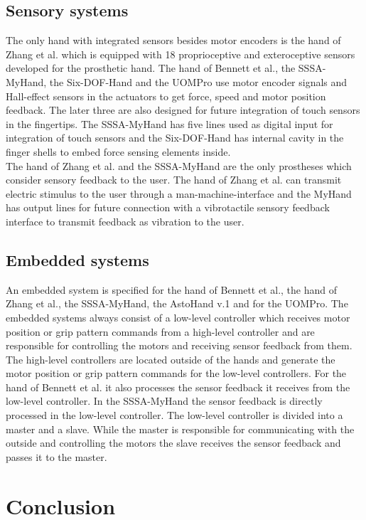 \documentclass[a4paper, 10pt, conference]{ieeeconf}      %
\begin{document}
\subsection{Sensory systems}

The only hand with integrated sensors besides motor encoders is the hand of Zhang et al. which is equipped with 18 proprioceptive and exteroceptive sensors developed for the prosthetic hand. The hand of Bennett et al., the SSSA-MyHand, the Six-DOF-Hand and the UOMPro use motor encoder signals and Hall-effect sensors in the actuators to get force, speed and motor position feedback. The later three are also designed for future integration of touch sensors in the fingertips. The SSSA-MyHand has five lines used as digital input for integration of touch sensors and the Six-DOF-Hand has internal cavity in the finger shells to embed force sensing elements inside.\\
The hand of Zhang et al. and the SSSA-MyHand are the only prostheses which consider sensory feedback to the user. The hand of Zhang et al. can transmit electric stimulus to the user through a man-machine-interface and the MyHand has output lines for future connection with a vibrotactile sensory feedback interface to transmit feedback as vibration to the user.

\subsection{Embedded systems}

An embedded system is specified for the hand of Bennett et al., the hand of Zhang et al., the SSSA-MyHand, the AstoHand v.1 and for the UOMPro. The embedded systems always consist of a low-level controller which receives motor position or grip pattern commands from a high-level controller and are responsible for controlling the motors and receiving sensor feedback from them. The high-level controllers are located outside of the hands and generate the motor position or grip pattern commands for the low-level controllers. For the hand of Bennett et al. it also processes the sensor feedback it receives from the low-level controller. In the SSSA-MyHand the sensor feedback is directly processed in the low-level controller. The low-level controller is divided into a master and a slave. While the master is responsible for communicating with the outside and controlling the motors the slave receives the sensor feedback and passes it to the master.


\section{Conclusion}
\end{document}
